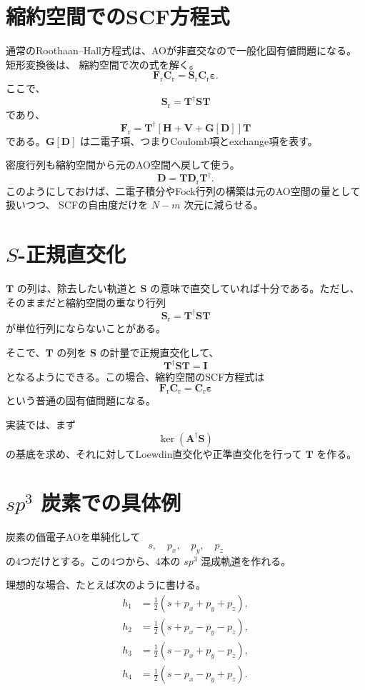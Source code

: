 \documentclass[uplatex,dvipdfmx,11pt]{jsarticle}
\newcommand{\Hcore}{\mathbf H}
\newcommand{\Venv}{\mathbf V}
\newcommand{\Smat}{\mathbf S}
\newcommand{\Amat}{\mathbf A}
\newcommand{\Tmat}{\mathbf T}
\newcommand{\Cr}{\mathbf C_{\mathrm r}}
\newcommand{\Fr}{\mathbf F_{\mathrm r}}
\newcommand{\Sr}{\mathbf S_{\mathrm r}}
\newcommand{\Dmat}{\mathbf D}
\newcommand{\Dr}{\mathbf D_{\mathrm r}}
\newcommand{\Gmat}{\mathbf G}
\begin{document}
\section{縮約空間でのSCF方程式}

通常のRoothaan--Hall方程式は、AOが非直交なので一般化固有値問題になる。矩形変換後は、
縮約空間で次の式を解く。
\[
  \Fr\Cr=\Sr\Cr\boldsymbol\varepsilon .
\]
ここで、
\[
  \Sr=\Tmat^\dagger\Smat\Tmat
\]
であり、
\[
  \Fr
  =
  \Tmat^\dagger
  \left[
    \Hcore+\Venv+\Gmat[\Dmat]
  \right]
  \Tmat
\]
である。\(\Gmat[\Dmat]\) は二電子項、つまりCoulomb項とexchange項を表す。

密度行列も縮約空間から元のAO空間へ戻して使う。
\[
  \Dmat = \Tmat\Dr\Tmat^\dagger .
\]
このようにしておけば、二電子積分やFock行列の構築は元のAO空間の量として扱いつつ、
SCFの自由度だけを \(N-m\) 次元に減らせる。

\section{\(S\)-正規直交化}

\(\Tmat\) の列は、除去したい軌道と \(\Smat\) の意味で直交していれば十分である。ただし、
そのままだと縮約空間の重なり行列
\[
  \Sr=\Tmat^\dagger\Smat\Tmat
\]
が単位行列にならないことがある。

そこで、\(\Tmat\) の列を \(\Smat\) の計量で正規直交化して、
\[
  \Tmat^\dagger\Smat\Tmat=\mathbf I
\]
となるようにできる。この場合、縮約空間のSCF方程式は
\[
  \Fr\Cr=\Cr\boldsymbol\varepsilon
\]
という普通の固有値問題になる。

実装では、まず
\[
  \ker(\Amat^\dagger\Smat)
\]
の基底を求め、それに対してLoewdin直交化や正準直交化を行って \(\Tmat\) を作る。

\section{\(sp^3\) 炭素での具体例}

炭素の価電子AOを単純化して
\[
  s,\quad p_x,\quad p_y,\quad p_z
\]
の4つだけとする。この4つから、4本の \(sp^3\) 混成軌道を作れる。

理想的な場合、たとえば次のように書ける。
\begin{align*}
h_1 &= \frac12(s+p_x+p_y+p_z), \\
h_2 &= \frac12(s+p_x-p_y-p_z), \\
h_3 &= \frac12(s-p_x+p_y-p_z), \\
h_4 &= \frac12(s-p_x-p_y+p_z).
\end{align*}
\end{document}
